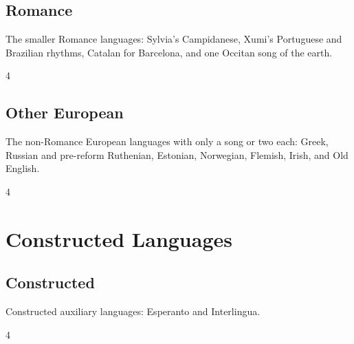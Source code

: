 \documentclass[a4paper,landscape]{memoir}
\begin{document}
\chapter{Romance}
The smaller Romance languages: Sylvia's Campidanese, Xumi's Portuguese and Brazilian rhythms, Catalan for Barcelona, and one Occitan song of the earth.
\clearpage\begin{multicols*}{4}
\end{multicols*}

\chapter{Other European}
The non-Romance European languages with only a song or two each: Greek, Russian and pre-reform Ruthenian, Estonian, Norwegian, Flemish, Irish, and Old English.
\clearpage\begin{multicols*}{4}
\end{multicols*}

\part{Constructed Languages}

\chapter{Constructed}
Constructed auxiliary languages: Esperanto and Interlingua.
\clearpage\begin{multicols*}{4}
\end{multicols*}
\end{document}
